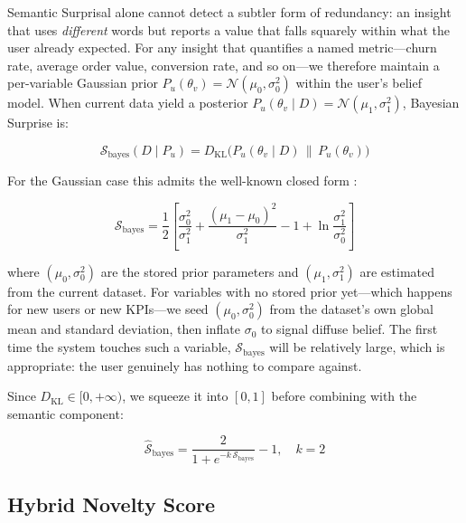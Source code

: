 \documentclass[conference]{IEEEtran}
\begin{document}
Semantic Surprisal alone cannot detect a subtler form of redundancy:
an insight that uses \emph{different} words but reports a value that
falls squarely within what the user already expected. For any insight
that quantifies a named metric---churn rate, average order value,
conversion rate, and so on---we therefore maintain a per-variable
Gaussian prior $P_u(\theta_v) = \mathcal{N}(\mu_0, \sigma_0^2)$
within the user's belief model. When current data yield a posterior
$P_u(\theta_v \mid D) = \mathcal{N}(\mu_1, \sigma_1^2)$, Bayesian
Surprise is:

\begin{equation}
  \mathcal{S}_{\text{bayes}}(D \mid P_u)
    = D_{\mathrm{KL}}\!\bigl(P_u(\theta_v \mid D) \,\|\, P_u(\theta_v)\bigr)
  \label{eq:kl}
\end{equation}

For the Gaussian case this admits the well-known closed form
\cite{bishop2006pattern}:

\begin{equation}
  \mathcal{S}_{\text{bayes}}
    = \frac{1}{2}\!\left[
        \frac{\sigma_0^2}{\sigma_1^2}
        + \frac{(\mu_1 - \mu_0)^2}{\sigma_1^2}
        - 1
        + \ln\!\frac{\sigma_1^2}{\sigma_0^2}
      \right]
  \label{eq:kl_gauss}
\end{equation}

where $(\mu_0, \sigma_0^2)$ are the stored prior parameters and
$(\mu_1, \sigma_1^2)$ are estimated from the current dataset.
For variables with no stored prior yet---which happens for new users
or new KPIs---we seed $(\mu_0, \sigma_0^2)$ from the dataset's own
global mean and standard deviation, then inflate $\sigma_0$ to
signal diffuse belief. The first time the system touches such a
variable, $\mathcal{S}_{\text{bayes}}$ will be relatively large,
which is appropriate: the user genuinely has nothing to compare
against.

Since $D_{\mathrm{KL}} \in [0, +\infty)$, we squeeze it into
$[0, 1]$ before combining with the semantic component:

\begin{equation}
  \hat{\mathcal{S}}_{\text{bayes}}
    = \frac{2}{1 + e^{-k \,\mathcal{S}_{\text{bayes}}}} - 1,
    \quad k = 2
  \label{eq:sigmoid}
\end{equation}

\subsection{Hybrid Novelty Score}
\end{document}
